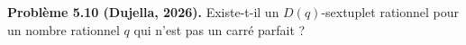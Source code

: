 \textbf{Problème 5.10 (Dujella, 2026).} Existe-t-il un $D(q)$-sextuplet rationnel pour un nombre rationnel $q$ qui n'est pas un carré parfait ?
